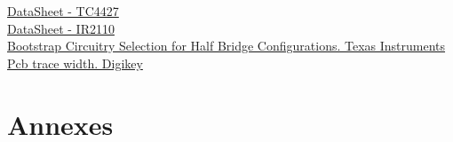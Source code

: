 \documentclass{article}
\begin{document}
\begin{thebibliography}{30}
\href{https://docs.rs-online.com/b7d2/A700000006627954.pdf}{DataSheet - TC4427}\\ 

\href{https://docs.rs-online.com/540a/0900766b8006356a.pdf}{DataSheet - IR2110}\\ 

\href{https://www.ti.com/lit/an/slua887a/slua887a.pdf?ts=1712575686076&ref_url=https%253A%252F%252Fwww.google.com%252F}{Bootstrap Circuitry Selection for Half Bridge Configurations. Texas Instruments} \\ 

\href{https://www.digikey.fr/fr/resources/conversion-calculators/conversion-calculator-pcb-trace-width}{Pcb trace width. Digikey}\\ 




\end{thebibliography}

\newpage
\section{Annexes}
\end{document}
